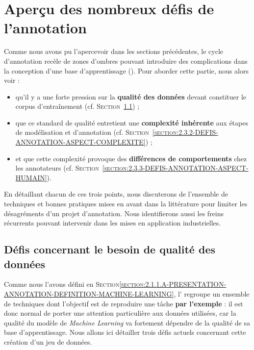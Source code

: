 \section{Aperçu des nombreux défis de l'annotation}
\label{section:2.3-DEFIS-ANNOTATION}

	
	Comme nous avons pu l'apercevoir dans les sections précédentes, le cycle d'annotation recèle de zones d'ombres pouvant introduire des complications dans la conception d'une base d'apprentissage (\cite{baledent:2022:complexite-annotation-manuelle}).
	Pour aborder cette partie, nous alors voir :
	\begin{itemize}
		\item qu'il y a une forte pression sur la \textbf{qualité des données} devant constituer le corpus d'entraînement (cf. \textsc{Section~\ref{section:2.3.1-DEFIS-ANNOTATION-ASPECT-DONNEES}}) ;
		\item que ce standard de qualité entretient une \textbf{complexité inhérente} aux étapes de modélisation et d'annotation (cf. \textsc{Section~\ref{section:2.3.2-DEFIS-ANNOTATION-ASPECT-COMPLEXITE}}) ;
		\item et que cette complexité provoque des \textbf{différences de comportements} chez les annotateurs (cf. \textsc{Section~\ref{section:2.3.3-DEFIS-ANNOTATION-ASPECT-HUMAIN}}).
	\end{itemize}
	En détaillant chacun de ces trois points, nous discuterons de l'ensemble de techniques et bonnes pratiques mises en avant dans la littérature pour limiter les désagréments d'un projet d'annotation.
	Nous identifierons aussi les freins récurrents pouvant intervenir dans les mises en application industrielles.
	
	
	\subsection{Défis concernant le besoin de qualité des données}
	\label{section:2.3.1-DEFIS-ANNOTATION-ASPECT-DONNEES}
	
		Comme nous l'avons défini en \textsc{Section\ref{section:2.1.1.A-PRESENTATION-ANNOTATION-DEFINITION-MACHINE-LEARNING}}, l' regroupe un ensemble de techniques dont l'objectif est de reproduire une tâche \textbf{par l'exemple} : il est donc normal de porter une attention particulière aux données utilisées, car la qualité du modèle de \textit{Machine Learning} va fortement dépendre de la qualité de sa base d'apprentissage.
		Nous allons ici détailler trois défis actuels concernant cette création d'un jeu de données.
		
